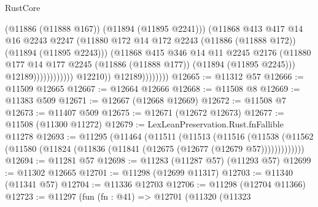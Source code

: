 \begin{lexlean}{RustCore}
\begin{coremodule}
                                              (@11886 (@11888 @167))
                                              (@11894 (@11895 @2241)))
                                            (@11868
                                              @413
                                              @417
                                              @14
                                              @16
                                              @2243
                                              @2247
                                              (@11880
                                                @172
                                                @14
                                                @172
                                                @2243
                                                (@11886 (@11888 @172))
                                                (@11894 (@11895 @2243)))
                                              (@11868
                                                @415
                                                @346
                                                @14
                                                @11
                                                @2245
                                                @2176
                                                (@11880
                                                  @177
                                                  @14
                                                  @177
                                                  @2245
                                                  (@11886 (@11888 @177))
                                                  (@11894 (@11895 @2245)))
                                                @12189))))))))))))
                        @12210))
                    @12189))))))))
@12665 := @11312 @57
@12666 := @11509 @12665
@12667 := @12664 @12666
@12668 := @11508 @8
@12669 := @11383 @509
@12671 := @12667 (@12668 @12669)
@12672 := @11508 @7
@12673 := @11407 @509
@12675 := @12671 (@12672 @12673)
@12677 := @11508 (@11300 @11272)
@12679 := LexLeanPreservation.Rust.fnFallible @11278
@12693 := @11295
    (@11464
      (@11511
        (@11513
          (@11516
            (@11538 (@11562 (@11580 (@11824 (@11836 (@11841 (@12675 (@12677 (@12679 @57)))))))))))))
@12694 := @11281 @57
@12698 := @11283 (@11287 @57) (@11293 @57)
@12699 := @11302 @12665
@12701 := @11298 (@12699 @11317)
@12703 := @11340 (@11341 @57)
@12704 := @11336 @12703
@12706 := @11298 (@12704 @11366)
@12723 := @11297
    (fun (fn : @41) =>
    @12701
      (@11320
        (@11323

\end{coremodule}
\end{lexlean}
